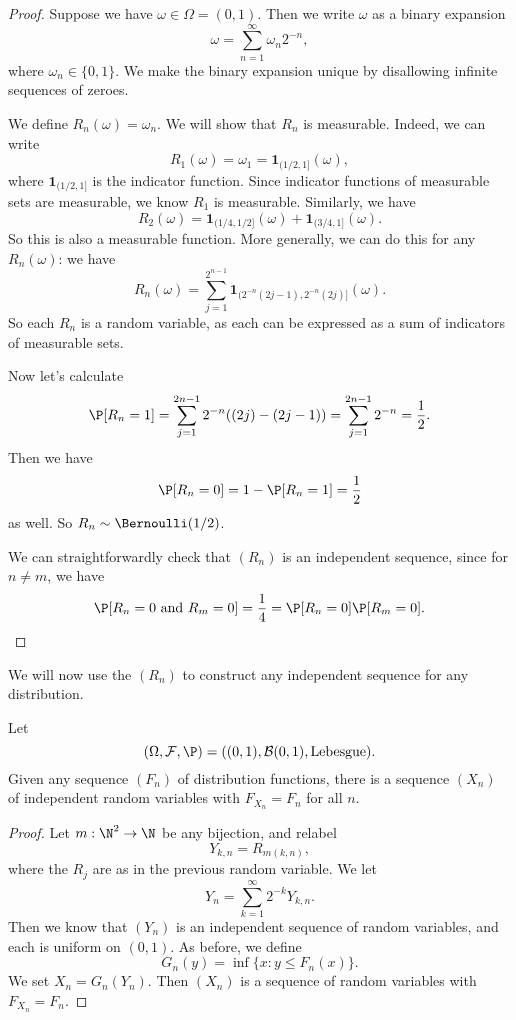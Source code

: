 \documentclass[a4paper]{article}
\begin{document}
\begin{proof}
  Suppose we have $\omega \in \Omega = (0, 1)$. Then we write $\omega$ as a binary expansion
  \[
    \omega = \sum_{n = 1}^\infty \omega_n 2^{-n},
  \]
  where $\omega_n \in \{0, 1\}$. We make the binary expansion unique by disallowing infinite sequences of zeroes.

  We define $R_n(\omega) = \omega_n$. We will show that $R_n$ is measurable. Indeed, we can write
  \[
    R_1(\omega) = \omega_1 = \mathbf{1}_{(1/2, 1]}(\omega),
  \]
  where $\mathbf{1}_{(1/2, 1]}$ is the indicator function. Since indicator functions of measurable sets are measurable, we know $R_1$ is measurable. Similarly, we have
  \[
    R_2(\omega) = \mathbf{1}_{(1/4, 1/2]}(\omega) + \mathbf{1}_{(3/4, 1]}(\omega).
  \]
  So this is also a measurable function. More generally, we can do this for any $R_n(\omega)$: we have
  \[
    R_n(\omega) = \sum_{j = 1}^{2^{n - 1}} \mathbf{1}_{(2^{-n}(2j - 1), 2^{-n}(2j)]} (\omega).
  \]
  So each $R_n$ is a random variable, as each can be expressed as a sum of indicators of measurable sets.

  Now let's calculate
  \[
    \P[R_n = 1] = \sum_{j = 1}^{2n - 1} 2^{-n}((2j) - (2j - 1)) = \sum_{j = 1}^{2n - 1} 2^{-n} = \frac{1}{2}.
  \]
  Then we have
  \[
    \P[R_n = 0] = 1 - \P[R_n = 1] = \frac{1}{2}
  \]
  as well. So $R_n \sim \Bernoulli(1/2)$.

  We can straightforwardly check that $(R_n)$ is an independent sequence, since for $n \not= m$, we have
  \[
    \P[R_n = 0 \text{ and }R_m = 0] = \frac{1}{4} = \P[R_n = 0] \P[R_m = 0].\qedhere
  \]
\end{proof}

We will now use the $(R_n)$ to construct any independent sequence for any distribution.

\begin{prop}
  Let
  \[
    (\Omega, \mathcal{F}, \P) = ((0, 1), \mathcal{B}(0, 1), \text{Lebesgue}).
  \]
  Given any sequence $(F_n)$ of distribution functions, there is a sequence $(X_n)$ of independent random variables with $F_{X_n} = F_n$ for all $n$.
\end{prop}

\begin{proof}
  Let $m: \N^2 \to \N$ be any bijection, and relabel
  \[
    Y_{k, n} = R_{m(k, n)},
  \]
  where the $R_j$ are as in the previous random variable. We let
  \[
    Y_n = \sum_{k = 1}^\infty 2^{-k} Y_{k, n}.
  \]
  Then we know that $(Y_n)$ is an independent sequence of random variables, and each is uniform on $(0, 1)$. As before, we define
  \[
    G_n(y) = \inf\{x: y \leq F_n(x)\}.
  \]
  We set $X_n = G_n(Y_n)$. Then $(X_n)$ is a sequence of random variables with $F_{X_n} = F_n$.
\end{proof}
\end{document}
